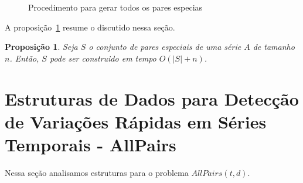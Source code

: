 \documentclass[dissertacao, brazil]{ThesisPUC}
\newtheorem{prop}[thm]{Proposição}
\begin{document}
\begin{figure}

\caption{Procedimento para gerar todos os pares especias}
\label{fig:GenSpecialPairs}
\end{figure}


A proposição~\ref{genspecialpairs} resume o discutido nessa seção. 

\begin{prop}
Seja $S$ o conjunto de pares especiais de uma série $A$ de tamanho $n$. Então, 
$S$ pode ser construido em tempo $O(|S| + n)$.
\label{genspecialpairs}
\end{prop}

\section{Estruturas de Dados para Detecção de Variações Rápidas em Séries Temporais - AllPairs}

Nessa seção analisamos estruturas para o problema $AllPairs(t,d)$.
\end{document}
